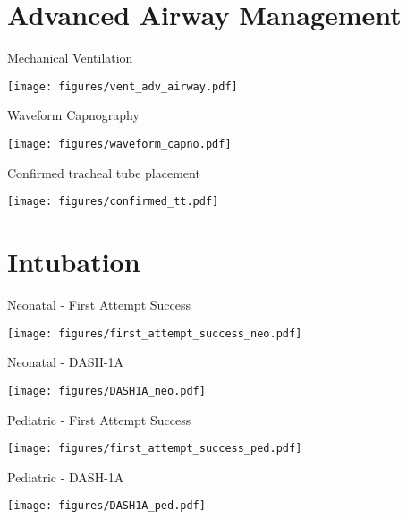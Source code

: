 \documentclass[ignorenonframetext,]{beamer}
\makeatletter
\def\maxwidth{\ifdim\Gin@nat@width>\linewidth\linewidth\else\Gin@nat@width\fi}
\def\maxheight{\ifdim\Gin@nat@height>\textheight0.8\textheight\else\Gin@nat@height\fi}
\renewcommand{\includegraphics}[2][]{%
    \Oldincludegraphics[#1,width=\maxwidth,height=\maxheight,keepaspectratio]{#2}}
\makeatother
\begin{document}
\section{Advanced Airway Management}\label{advanced-airway-management}

\begin{frame}{Mechanical Ventilation}

\texttt{[image: figures/vent\_adv\_airway.pdf]}

\end{frame}

\begin{frame}{Waveform Capnography}

\texttt{[image: figures/waveform\_capno.pdf]}

\end{frame}

\begin{frame}{Confirmed tracheal tube placement}

\texttt{[image: figures/confirmed\_tt.pdf]}

\end{frame}

\section{Intubation}\label{intubation}

\begin{frame}{Neonatal - First Attempt Success}

\texttt{[image: figures/first\_attempt\_success\_neo.pdf]}

\end{frame}

\begin{frame}{Neonatal - DASH-1A}

\texttt{[image: figures/DASH1A\_neo.pdf]}

\end{frame}

\begin{frame}{Pediatric - First Attempt Success}

\texttt{[image: figures/first\_attempt\_success\_ped.pdf]}

\end{frame}

\begin{frame}{Pediatric - DASH-1A}

\texttt{[image: figures/DASH1A\_ped.pdf]}

\end{frame}
\end{document}

